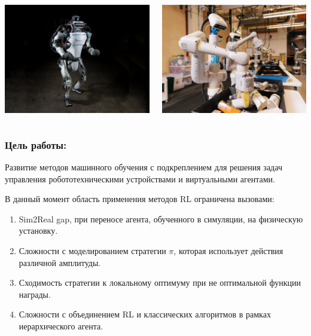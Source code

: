 \begin{frame}
\begin{columns}
\centering
\includegraphics[width=0.8\linewidth]{Presentation/images/boston_dunamics.jpg}

\vspace{10pt}
\centering
\includegraphics[width=0.8\linewidth]{Presentation/images/garbage_sorting.png}

\end{columns} 
\end{frame}

\begin{frame}
    \frametitle{Цель работы:}
     Развитие методов машинного обучения с подкреплением для решения задач управления робототехническими устройствами и виртуальными агентами.

    \vspace{20pt}
    В данный момент область применения методов RL ограничена вызовами:
    \begin{enumerate}
        \item Sim2Real gap, при переносе агента, обученного в симуляции, на физическую установку.
        \item Сложности с моделированием стратегии $\pi$, которая использует действия различной амплитуды.
        \item Сходимость стратегии к локальному  оптимуму при не оптимальной функции награды.
       \item Сложности с объединением RL и классических алгоритмов в рамках иерархического агента.
    \end{enumerate}
\end{frame}

